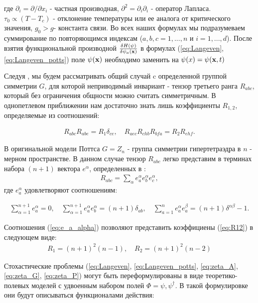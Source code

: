 \documentclass []{rusthesis} %
\def\bfx{{\bf x}}
\begin{document}
где $\partial_i = \partial/\partial x_i$ - частная производная, $\partial^2 = \partial_i \partial_i$ - оператор
Лапласа. $\tau_0 \propto (T-T_c)$ - отклонение температуры или ее аналога от критического значения, $g_0>g$- константа связи. 
Во всех наших формулах мы подразумеваем суммирование по повторяющимся индексам ($a,b,c = 1, ... ,n$ и $i =1, ... ,d$). 
После взятия функциональной производной $\frac{\delta H(\psi)}{\delta \psi_a (\bfx)}$ в формулах (\ref{eq:Langeven}, \ref{eq:Langeven_potts}) поле $\psi({\bf x})$ необходимо заменить на $\psi(x) = \psi({\bf x}, t) $

Следуя \cite{Alcantara}, мы будем рассматривать общий случай c определенной группой симметрии $G$, для которой
неприводимый инвариант - тензор третьего ранга $R_{abc}$, который без ограничения общности можно считать симметричным. В однопетлевом приближении нам достаточно знать лишь коэффициенты $R_{1,2}$, определяемые из соотношений:

\begin{eqnarray}
R_{abc}R_{abe} = R_1 \delta_{ce}, \quad R_{aec}R_{chb}R_{bfa} = R_2 R_{ehf}.
\label{eq:R12}
\end{eqnarray}

В оригинальной модели Поттса $G=Z_n$ - группа симметрии гипертетраэдра в $n$ - мерном пространстве. В
данном случае тензор $R_{abc}$ легко представим в терминах набора $(n+1)$ вектора $e^{\alpha}$, определенных в \cite{Golner, Zia}:
\begin{eqnarray}
R_{abc} = \sum_{\alpha} e^{\alpha}_{a}e^{\alpha}_{b}e^{\alpha}_{c},
\label{eq:R}
\end{eqnarray}
где $e^{\alpha}_{a}$ удовлетворяют соотношениям:

\begin{eqnarray}
\sum_{\alpha=1}^{n+1} e^{\alpha}_{a} = 0,\quad
\sum_{\alpha=1}^{n+1} e^{\alpha}_{a}e^{\alpha}_{b} = (n+1)\delta_{ab}, \quad
\sum_{a=1}^{n} e^{\alpha}_{a}e^{\beta}_{a} = (n+1)\delta^{\alpha \beta} -1.
\label{eq:e_a_alpha}
\end{eqnarray}

Соотношения (\ref{eq:e_a_alpha}) позволяют представить коэффициены (\ref{eq:R12}) в следующем виде:
\begin{eqnarray}
R_1 = (n+1)^2(n-1), \quad
R_2 = (n+1)^2(n-2)
\label{eq:R12_n}
\end{eqnarray}

Стохастические проблемы (\ref{eq:Langeven}, \ref{eq:Langeven_potts}, \ref{eq:zeta_A}, \ref{eq:zeta_G}, \ref{eq:zeta_P}) 
могут быть переформулированы в виде теоретико-полевых моделей с удвоенным набором полей $\Phi={\psi, \psi^\dagger}$. В
такой формулировке они будут описываться функционалами действия:
\end{document}

